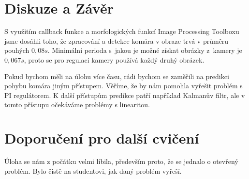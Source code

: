 \documentclass[a4paper,10pt]{article}
\begin{document}
\section{Diskuze a Závěr}

S využitím callback funkce a 
morfologických funkcí Image Processing Toolboxu jsme dosáhli toho, že zpracování a 
detekce komára v obraze trvá v průměru pouhých $0,08 s$. 
Minimální perioda s~jakou je možné získat obrázky z~kamery je $0,067 s$,
proto se pro regulaci kamery používá každý druhý obrázek.

Pokud bychom měli na úlohu více času, rádi bychom se zaměřili na predikci pohybu komára jiným přístupem.
Věříme, že by nám pomohla vyřešit problém s PI regulátorem.
K další přístupům predikce patří například Kalmanův filtr, 
ale v tomto přístupu očekáváme problémy s linearitou. 
 
\section*{Doporučení pro další cvičení}

Úloha se nám z počátku velmi líbila, především proto, že se jednalo o otevřený problém. 
Bylo čistě na studentovi, jak daný problém vyřeší.



\end{document}
